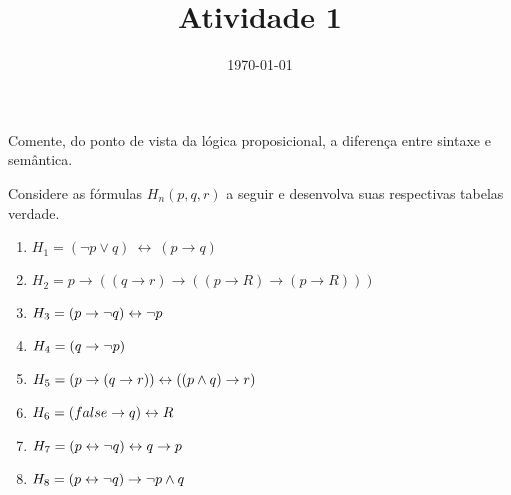 \documentclass[a4paper, 11pt]{article}
\date{\today}
\title{Atividade 1}
\begin{document}

    \begin{question}
        Comente, do ponto de vista da lógica proposicional, a diferença entre sintaxe e semântica.
    \end{question}

    \begin{question}
        Considere as fórmulas $H_n(p, q, r)$ a seguir e desenvolva suas respectivas tabelas verdade.
        \begin{enumerate}[\bf \quad a.]
            \item $H_1 = (\lnot p \lor q)~\leftrightarrow~(p \rightarrow q)$
            \item $H_2 = p \rightarrow ((q \rightarrow r) \rightarrow ((p \rightarrow R) \rightarrow (p \rightarrow R)))$ 
            \item $H_3 = (p \rightarrow \lnot q) \leftrightarrow \lnot p $
            \item $H_4 = (q \rightarrow \lnot p) $
            \item $H_5 = (p \rightarrow (q \rightarrow r)) \leftrightarrow ((p \land q) \rightarrow r) $
            \item $H_6 = (false \rightarrow q) \leftrightarrow R$
            \item $H_7 = (p \leftrightarrow \lnot q) \leftrightarrow q \rightarrow p$
            \item $H_8 = (p \leftrightarrow \lnot q) \rightarrow \lnot p \land q$
        \end{enumerate}
    \end{question}

    \begin{question}
        
    \end{question}
\end{document}

